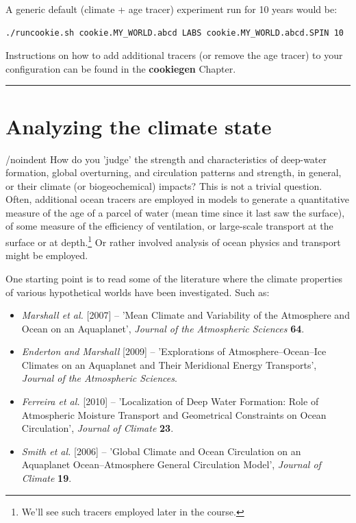 A generic default (climate + age tracer) experiment run for 10 years would be:

\vspace{-2mm}\small\begin{verbatim}
./runcookie.sh cookie.MY_WORLD.abcd LABS cookie.MY_WORLD.abcd.SPIN 10
\end{verbatim}\normalsize\vspace{-2mm}

\vspace{1mm}
\noindent Instructions on how to add additional tracers (or remove the age tracer) to your configuration can be found in the \textbf{cookiegen} Chapter.

\vspace{1mm}\noindent\rule{4cm}{0.5pt}\vspace{2mm}

\newpage

\section{Analyzing the climate state}

/noindent How do you 'judge' the strength and characteristics of deep-water formation, global overturning, and circulation patterns and strength, in general, or their climate (or biogeochemical) impacts? This is not a trivial question. Often, additional ocean tracers are employed in models to generate a quantitative measure of the age of a parcel of water (mean time since it last saw the surface), of some measure of the efficiency of ventilation, or large-scale transport at the surface or at depth.\footnote{We'll see such tracers employed later in the course.} Or rather involved analysis of ocean physics and transport might be employed.

One starting point is to read some of the literature where the climate properties of various hypothetical worlds have been investigated. Such as:
\vspace{1mm}

\begin{itemize}[noitemsep]
\item \textit{Marshall et al.} [2007] -- 'Mean Climate and Variability of the Atmosphere and Ocean on an Aquaplanet', \textit{Journal of the Atmospheric Sciences} \textbf{64}.
\item \textit{Enderton and Marshall} [2009] -- 'Explorations of Atmosphere--Ocean--Ice Climates on an Aquaplanet and Their Meridional Energy Transports', \textit{Journal of the Atmospheric Sciences}.
\item \textit{Ferreira et al.} [2010] -- 'Localization of Deep Water Formation: Role of Atmospheric Moisture Transport and Geometrical Constraints on Ocean Circulation', \textit{Journal of Climate} \textbf{23}.
\item \textit{Smith et al.} [2006] -- 'Global Climate and Ocean Circulation on an Aquaplanet Ocean–Atmosphere General Circulation Model',  \textit{Journal of Climate} \textbf{19}.
\end{itemize}

